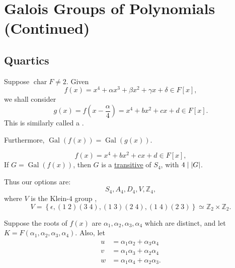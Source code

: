 \documentclass[notoc,notitlepage,nobib]{tufte-book}
\DeclareMathOperator{\Gal}{Gal}
\DeclareMathOperator{\Char}{char}
\begin{document}
\section{Galois Groups of Polynomials (Continued)}%
\label{sec:galois_groups_of_polynomials_continued}

\subsection{Quartics}%
\label{sub:quartics}

\begin{defn}\label{defn:depressed_quartic}
  Suppose $\Char F \neq 2$. Given
  \begin{equation*}
    f(x) = x^4 + \alpha x^3 + \beta x^2 + \gamma x + \delta \in F[x],
  \end{equation*}
  we shall consider
  \begin{equation*}
    g(x) = f\left(x - \frac{\alpha}{4}\right) = x^4 + bx^2 + cx + d \in F[x].
  \end{equation*}
  This is similarly called a .
\end{defn}

\begin{note}
  Furthermore, $\Gal(f(x)) = \Gal(g(x))$. 
\end{note}

\begin{equation*}
  f(x) = x^4 + b x^2 + c x + d \in F[x],
\end{equation*}
If $G = \Gal(f(x))$, then $G$ is a
\hyperref[defn:transitive_subgroup]{transitive} of $S_4$, with $4 \mid \left|G\right|$.

Thus our options are:
\begin{equation*}
  S_4, A_4, D_4, V, \mathbb{Z}_4,
\end{equation*}
where $V$ is the Klein-$4$ group ,
\begin{equation*}
  V = \left\{ \epsilon, (1 \; 2)(3 \; 4), (1 \; 3)(2 \; 4), (1\; 4)(2 \; 3)
  \right\} \simeq \mathbb{Z}_2 \times \mathbb{Z}_2.
\end{equation*}

Suppose the roots of $f(x)$ are $\alpha_1, \alpha_2, \alpha_3, \alpha_4$ which
are distinct, and let $K = F(\alpha_1, \alpha_2, \alpha_3, \alpha_4)$. Also,
let
\begin{align*}
  u &= \alpha_1 \alpha_2 + \alpha_3 \alpha_4 \\
  v &= \alpha_1 \alpha_3 + \alpha_2 \alpha_4 \\
  w &= \alpha_1 \alpha_4 + \alpha_2 \alpha_3.
\end{align*}
\end{document}
